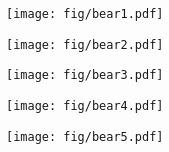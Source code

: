 \begin{figure*}[htbp]
    \centering

    \begin{subfigure}{0.19\linewidth}
        \begin{minipage}[t]{1.0\linewidth}
            \centering
            \texttt{[image: fig/bear1.pdf]}
        \end{minipage}
    \end{subfigure}
    \hfill
    \begin{subfigure}{0.19\linewidth}
        \begin{minipage}[t]{1.0\linewidth}
            \centering
            \texttt{[image: fig/bear2.pdf]}
        \end{minipage}
    \end{subfigure}
    \hfill
    \begin{subfigure}{0.19\linewidth}
        \begin{minipage}[t]{1.0\linewidth}
            \centering
            \texttt{[image: fig/bear3.pdf]}
        \end{minipage}
    \end{subfigure}
    \hfill
    \begin{subfigure}{0.19\linewidth}
        \begin{minipage}[t]{1.0\linewidth}
            \centering
            \texttt{[image: fig/bear4.pdf]}
        \end{minipage}
    \end{subfigure}
    \hfill
    \begin{subfigure}{0.19\linewidth}
        \begin{minipage}[t]{1.0\linewidth}
            \centering
            \texttt{[image: fig/bear5.pdf]}
        \end{minipage}
    \end{subfigure}


\end{figure*}
